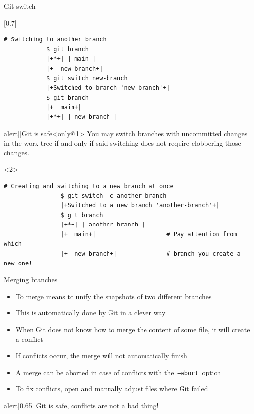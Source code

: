 \documentclass[usenames,svgnames,14pt]{beamer}
\begin{document}
\begin{frame}[fragile]{Git switch}
    \vspace{-8mm}
    \begin{overlayarea}{\textwidth}{0.8\textheight}
        \begin{varblock}{}[0.7\textwidth]{}
        \end{varblock}
        \begin{lstlisting}[style=MyBash]
            # Switching to another branch
            $ git branch
            |+*+| |-main-|
            |+  new-branch+|
            $ git switch new-branch
            |+Switched to branch 'new-branch'+|
            $ git branch
            |+  main+|
            |+*+| |-new-branch-|
        \end{lstlisting}
        \begin{varblock}{alert}[\textwidth]{Git is safe}<only@1>
            \small
            You may switch branches with uncommitted changes in the work-tree if and only if said switching does not require clobbering those changes.
        \end{varblock}
        \begin{onlyenv}<2>
            \begin{lstlisting}[style=MyBash]
                # Creating and switching to a new branch at once
                $ git switch -c another-branch
                |+Switched to a new branch 'another-branch'+|
                $ git branch
                |+*+| |-another-branch-|
                |+  main+|                    # Pay attention from which
                |+  new-branch+|              # branch you create a new one!
            \end{lstlisting}
        \end{onlyenv}
    \end{overlayarea}
\end{frame}
\begin{frame}{Merging branches}
    \setlength{\leftmargini}{0.6cm}
    \begin{itemize}
        \item To merge means to unify the snapshots of two different branches
        \item This is automatically done by Git in a clever way
        \item When Git does not know how to merge the content of some file, it will create a conflict
        \item If conflicts occur, the merge will not automatically finish
        \item A merge can be aborted in case of conflicts with the \,\texttt{--abort}\, option
        \item To fix conflicts, open and manually adjust files where Git failed
    \end{itemize}
    \medskip
    \begin{varblock}{alert}[0.65\textwidth]{}
        \alert{Git is safe, conflicts are not a bad thing!}
    \end{varblock}
\end{frame}
\end{document}
